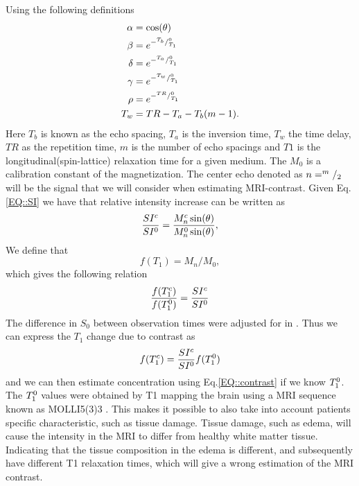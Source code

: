 \documentclass[11pt,a4paper]{article}
\begin{document}
Using the following definitions
\begin{equation}
\begin{aligned}
\alpha &= \cos ( \theta ) \\
\beta  &= e\sp{- \sp{T_b}/_{T_1}\sp{0} } \\
\delta &= e\sp{- \sp{T_a}/_{T_1}\sp{0} } \\
\gamma &= e\sp{- \sp{T_w}/_{T_1}\sp{0} } \\
\rho   &= e\sp{- \sp{TR}/_{T_1}\sp{0} }  \\
T_w    &= TR - T_a -T_b(m-1)       .\\
\end{aligned}
\end{equation}
Here $T_b$ is known as the echo spacing, $T_a$ is the inversion time, $T_w$ the time delay, $TR$ as the repetition time, $m$ is the number of echo spacings and $T1$ is the longitudinal(spin-lattice) relaxation time for a given medium. The $M_0$ is a calibration constant of the magnetization. The center echo denoted as $n=\sp{m}/_2$ will be the signal that we will consider when estimating MRI-contrast. Given Eq.\ref{EQ::SI} we have that relative intensity increase can be written as 
\begin{equation}
\frac{SI\sp{c}}{SI\sp{0}} = \frac{ M_{n}\sp{c} \sin (\theta)}{ M_{n}\sp{0} \sin (\theta) } ,
\end{equation}
We define that  
\begin{equation}
f(T_1) = M_{n}/M_{0} ,
\label{Eq::F}
\end{equation}
which gives the following relation 
\begin{equation}
\frac{f(T_{1}\sp{c} ) }{f(T_{1}\sp{0})}  = \frac{SI\sp{c}}{SI\sp{0}} 
\end{equation}
The difference in $S_0$ between observation times were adjusted for in \citep{eidevalnes}.  
Thus we can express the $T_1$ change due to contrast as 
\begin{equation}
f ( T_{1}\sp{c} ) = \frac{SI\sp{c}}{SI\sp{0}} f(T_{1}\sp{0}) 
\end{equation}
and we can then estimate concentration using Eq.\ref{EQ::contrast} if we know $T_{1}\sp{0}$. The $T_{1}\sp{0}$ values were obtained by T1 mapping the brain using a MRI sequence known as MOLLI5(3)3 \cite{TAYLOR201667}. This makes it possible to also take into account patients specific characteristic, such as tissue damage. Tissue damage, such as edema, will cause the intensity in the MRI to differ from healthy white matter tissue. Indicating that the tissue composition in the edema is different, and subsequently have different T1 relaxation times, which will give a wrong estimation of the MRI contrast. 
\end{document}
